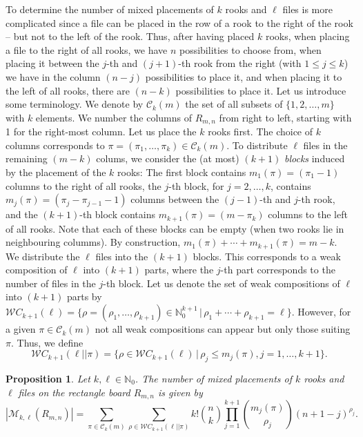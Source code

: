 \documentclass[10pt]{amsart}
\newtheorem{proposition}[theorem]{Proposition}%
\begin{document}
To determine the number of mixed placements of $k$ rooks and $\ell$ files is more complicated since a file can be placed in the row of a rook to the right of the rook -- but not to the left of the rook. Thus, after having placed $k$ rooks, when placing a file to the right of all rooks, we have $n$ possibilities to choose from, when placing it between the $j$-th and $(j+1)$-th rook from the right (with $1\leq j \leq k$) we have in the column $(n-j)$ possibilities to place it, and when placing it to the left of all rooks, there are $(n-k)$ possibilities to place it. Let us introduce some terminology. We denote by ${\mathcal C}_k(m)$ the set of all subsets of $\{1,2,\ldots,m\}$ with $k$ elements. We number the columns of $R_{m,n}$ from right to left, starting with 1 for the right-most column. Let us place the $k$ rooks first. The choice of $k$ columns corresponds to $\pi = (\pi_1,\ldots,\pi_k) \in {\mathcal C}_k(m)$. To distribute $\ell$ files in the remaining $(m-k)$ colums, we consider the (at most) $(k+1)$ {\em blocks} induced by the placement of the $k$ rooks: The first block contains $m_1(\pi)=(\pi_1-1)$ columns to the right of all rooks, the $j$-th block, for $j=2,\ldots,k$, contains $m_j(\pi)=(\pi_{j}-\pi_{j-1}-1)$ columns between the $(j-1)$-th and $j$-th rook, and the $(k+1)$-th block contains $m_{k+1}(\pi)=(m-\pi_k)$ columns to the left of all rooks. Note that each of these blocks can be empty (when two rooks lie in neighbouring columms). By construction, $m_1(\pi)+\cdots + m_{k+1}(\pi)=m-k$. We distribute the $\ell$ files into the $(k+1)$ blocks. This corresponds to a weak composition of $\ell$ into $(k+1)$ parts, where the $j$-th part corresponds to the number of files in the $j$-th block. Let us denote the set of weak compositions of $\ell$ into $(k+1)$ parts by ${\mathcal WC}_{k+1}(\ell)=\{\rho =(\rho_1,\ldots, \rho_{k+1}) \in \mathbb{N}_0^{k+1} \, | \, \rho_1+\cdots + \rho_{k+1} = \ell\} $. However, for a given $\pi \in {\mathcal C}_k(m)$ not all weak compositions can appear but only those suiting $\pi$. Thus, we define 
$$
{\mathcal WC}_{k+1}(\ell || \pi ) =\{\rho \in {\mathcal WC}_{k+1}(\ell) \, | \, \rho_j \leq m_j(\pi), j=1,\ldots, k+1 \}.
$$
\begin{proposition} Let $k,\ell \in \mathbb{N}_0$. The number of mixed placements of $k$ rooks and $\ell$ files on the rectangle board $R_{m,n}$ is given by
\begin{equation}\label{MRRectangle}
|{\mathcal M}_{k,\ell}(R_{m,n})|= \sum_{\pi \in {\mathcal C}_k(m)} \sum_{\rho \in {\mathcal WC}_{k+1}(\ell || \pi)}k!  \binom{n}{k} \prod_{j=1}^{k+1} \binom{m_{j}(\pi)}{\rho_{j}}(n+1-j)^{\rho_{j}}.
\end{equation}
\end{proposition}
\end{document}
